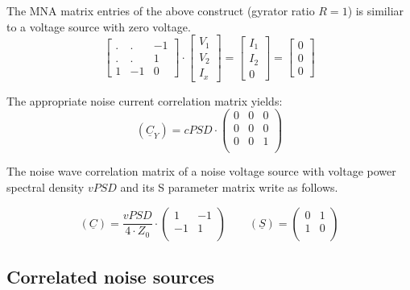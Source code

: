 The MNA matrix entries of the above construct (gyrator ratio $R=1$) is
similiar to a voltage source with zero voltage.
\begin{equation}
\begin{bmatrix}
.&.& -1\\
.&.& 1\\
1 & -1 & 0
\end{bmatrix}
\cdot
\begin{bmatrix}
V_{1}\\
V_{2}\\
I_x
\end{bmatrix}
=
\begin{bmatrix}
I_{1}\\
I_{2}\\
0
\end{bmatrix}
=
\begin{bmatrix}
0\\
0\\
0
\end{bmatrix}
\end{equation}

The appropriate noise current correlation matrix yields:
\begin{equation}
(\underline{C}_Y) = cPSD \cdot
\begin{pmatrix}
 0 & 0 & 0\\
 0 & 0 & 0\\
 0 & 0 & 1\\
\end{pmatrix}
\end{equation}

The noise wave correlation matrix of a noise voltage source with
voltage power spectral density $vPSD$ and its S parameter matrix
write as follows.

\begin{equation}
(\underline{C}) = \frac{vPSD}{4\cdot Z_0}\cdot
\begin{pmatrix}
   1 & -1\\
  -1 &  1\\
\end{pmatrix}
\qquad
(\underline{S}) =
\begin{pmatrix}
   0 &  1\\
   1 &  0\\
\end{pmatrix}
\end{equation}


\subsection{Correlated noise sources}

